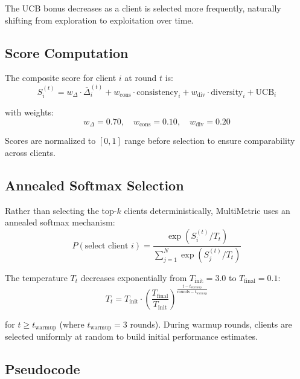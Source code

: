 The UCB bonus decreases as a client is selected more frequently, naturally shifting from exploration to exploitation over time.

\subsection{Score Computation}

The composite score for client \(i\) at round \(t\) is:
\[
S_i^{(t)} = w_{\Delta} \cdot \bar{\Delta}_i^{(t)} + w_{\text{cons}} \cdot \text{consistency}_i + w_{\text{div}} \cdot \text{diversity}_i + \text{UCB}_i
\]

with weights:
\[
w_{\Delta} = 0.70, \quad w_{\text{cons}} = 0.10, \quad w_{\text{div}} = 0.20
\]

Scores are normalized to \([0, 1]\) range before selection to ensure comparability across clients.

\subsection{Annealed Softmax Selection}

Rather than selecting the top-\(k\) clients deterministically, MultiMetric uses an annealed softmax mechanism:
\[
P(\text{select client } i) = \frac{\exp(S_i^{(t)} / T_t)}{\sum_{j=1}^{N} \exp(S_j^{(t)} / T_t)}
\]


The temperature \(T_t\) decreases exponentially from \(T_{\text{init}} = 3.0\) to \(T_{\text{final}} = 0.1\):
\[
T_t = T_{\text{init}} \cdot \left(\frac{T_{\text{final}}}{T_{\text{init}}}\right)^{\frac{t - t_{\text{warmup}}}{\text{rounds} - t_{\text{warmup}}}}
\]

for \(t \geq t_{\text{warmup}}\) (where \(t_{\text{warmup}} = 3\) rounds). During warmup rounds, clients are selected uniformly at random to build initial performance estimates.

\subsection{Pseudocode}

